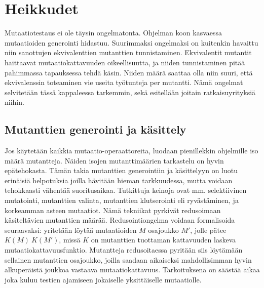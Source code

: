 \documentclass{tktltiki}
\begin{document}
\section{Heikkudet}
Mutaatiotestaus ei ole täysin ongelmatonta. Ohjelman koon kasvaessa mutaatioiden generointi hidastuu. Suurimmaksi ongelmaksi on kuitenkin havaittu niin sanottujen ekvivalenttien mutanttien tunnistaminen. Ekvivalentit mutantit haittaavat mutaatiokattavuuden oikeellisuutta, ja niiden tunnistaminen pitää pahimmassa tapauksessa tehdä käsin. Niiden määrä saattaa olla niin suuri, että ekvivalenssin toteaminen vie useita työtunteja per mutantti. Nämä ongelmat selvitetään tässä kappaleessa tarkemmin, sekä esitellään joitain ratkaisuyrityksiä niihin.

\subsection{Mutanttien generointi ja käsittely}
Jos käytetään kaikkia mutaatio-operaattoreita, luodaan pienillekkin ohjelmille iso määrä mutantteja. Näiden isojen mutanttimäärien tarkastelu on hyvin epätehokasta. Tämän takia mutanttien generointiin ja käsittelyyn on luotu erinäisiä helpotuksia joilla hävitään hieman tarkkuudessa, mutta voidaan tehokkaasti vähentää suoritusaikaa. Tutkittuja keinoja ovat mm. selektiivinen mutatointi, mutanttien valinta, mutanttien klutserointi eli ryvästäminen, ja korkeamman asteen mutaatiot. Nämä tekniikat pyrkivät redusoimaan käsiteltävien mutanttien määrää. Redusointiongelma voidaan formalisoida seuraavaksi: yritetään löytää mutaatioiden $M$ osajoukko $M'$, jolle pätee $K(M) ~ K(M')$, missä $K$ on mutanttien tuottaman kattavuuden laskeva mutaatiokattavuusfunktio. Mutantteja redusoitaessa pyritään siis löytämään sellainen mutanttien osajoukko, joilla saadaan aikaiseksi mahdollisimman hyvin alkuperäistä joukkoa vastaava mutaatiokattavuus. Tarkoituksena on säästää aikaa joka kuluu testien ajamiseen jokaiselle yksittäiselle mutaatiolle.
\end{document}
